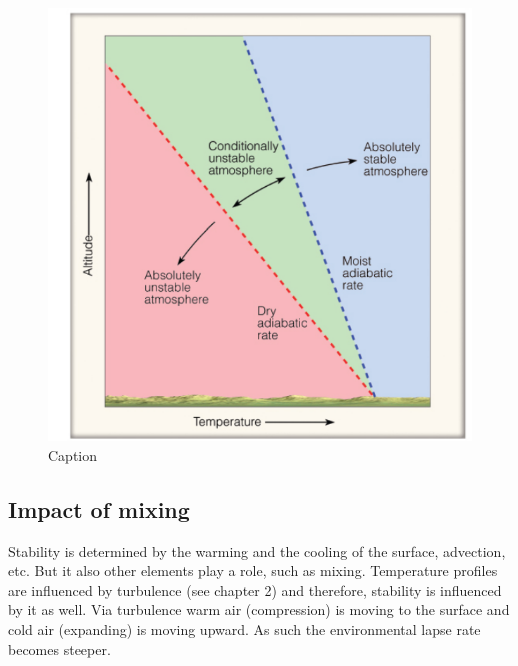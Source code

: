 \documentclass[12pt,oneside]{book}
\begin{document}
\begin{figure}

{\centering \includegraphics[width=1\linewidth]{figures/Figure312} 

}

\caption{Caption}\label{fig:Sumup}
\end{figure}

\subsection{Impact of mixing}\label{impact-of-mixing}

Stability is determined by the warming and the cooling of the surface,
advection, etc. But it also other elements play a role, such as mixing.
Temperature profiles are influenced by turbulence (see chapter 2) and
therefore, stability is influenced by it as well. Via turbulence warm
air (compression) is moving to the surface and cold air (expanding) is
moving upward. As such the environmental lapse rate becomes steeper.
\end{document}

